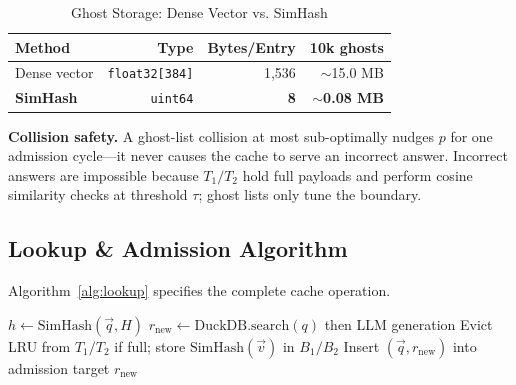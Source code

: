 \documentclass[conference,10pt]{IEEEtran}
\begin{document}
\begin{table}[htbp]
\centering
\caption{Ghost Storage: Dense Vector vs. SimHash}
\label{tab:memory}
\begin{tabular}{@{}lrrr@{}}
\toprule
\textbf{Method} & \textbf{Type} & \textbf{Bytes/Entry} & \textbf{10k ghosts} \\ \midrule
Dense vector & \texttt{float32[384]} & 1,536 & $\sim$15.0 MB \\
\textbf{SimHash} & \texttt{uint64}      & \textbf{8} & \textbf{$\sim$0.08 MB} \\
\bottomrule
\end{tabular}
\end{table}

\textbf{Collision safety.} A ghost-list collision at most sub-optimally nudges $p$ for one admission cycle—it never causes the cache to serve an incorrect answer. Incorrect answers are impossible because $T_1/T_2$ hold full payloads and perform cosine similarity checks at threshold $\tau$; ghost lists only tune the boundary.

\subsection{Lookup \& Admission Algorithm}

Algorithm~\ref{alg:lookup} specifies the complete cache operation.

\begin{algorithm}[htbp]
\small
\caption{Vector-ARC: Lookup, Ghost Evaluation, Admission}
\label{alg:lookup}
\BlankLine
{}
\BlankLine
{}
$h \leftarrow \text{SimHash}(\vec{q}, H)$\;
\BlankLine
{}
$r_{\text{new}} \leftarrow \text{DuckDB.search}(q)$ then LLM generation\;
Evict LRU from $T_1/T_2$ if full; store $\text{SimHash}(\vec{v})$ in $B_1/B_2$\;
Insert $(\vec{q}, r_{\text{new}})$ into admission target\;
\Return $r_{\text{new}}$\;
\end{algorithm}
\end{document}

